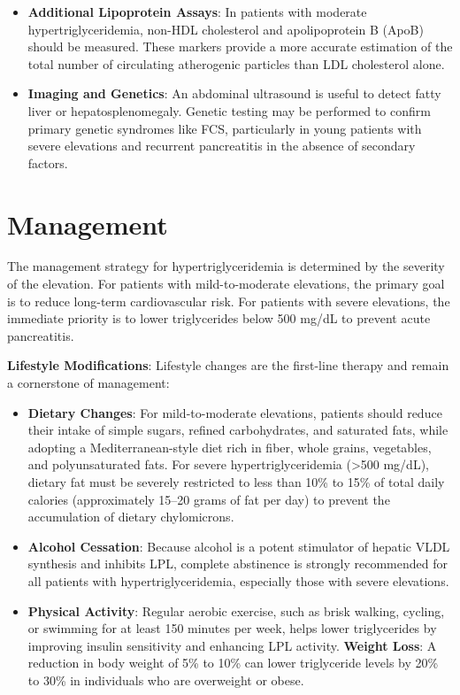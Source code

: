 \begin{itemize}
    \item \textbf{Additional Lipoprotein Assays}: In patients with moderate hypertriglyceridemia, non-HDL cholesterol and apolipoprotein B (ApoB) should be measured. These markers provide a more accurate estimation of the total number of circulating atherogenic particles than LDL cholesterol alone.
    \item \textbf{Imaging and Genetics}: An abdominal ultrasound is useful to detect fatty liver or hepatosplenomegaly. Genetic testing may be performed to confirm primary genetic syndromes like FCS, particularly in young patients with severe elevations and recurrent pancreatitis in the absence of secondary factors.
\end{itemize}

\section*{Management}
The management strategy for hypertriglyceridemia is determined by the severity of the elevation. For patients with mild-to-moderate elevations, the primary goal is to reduce long-term cardiovascular risk. For patients with severe elevations, the immediate priority is to lower triglycerides below 500 mg/dL to prevent acute pancreatitis.

\textbf{Lifestyle Modifications}:
Lifestyle changes are the first-line therapy and remain a cornerstone of management:
\begin{itemize}
    \item \textbf{Dietary Changes}: For mild-to-moderate elevations, patients should reduce their intake of simple sugars, refined carbohydrates, and saturated fats, while adopting a Mediterranean-style diet rich in fiber, whole grains, vegetables, and polyunsaturated fats. For severe hypertriglyceridemia (>500 mg/dL), dietary fat must be severely restricted to less than 10\% to 15\% of total daily calories (approximately 15--20 grams of fat per day) to prevent the accumulation of dietary chylomicrons.
    \item \textbf{Alcohol Cessation}: Because alcohol is a potent stimulator of hepatic VLDL synthesis and inhibits LPL, complete abstinence is strongly recommended for all patients with hypertriglyceridemia, especially those with severe elevations.
    \item \textbf{Physical Activity}: Regular aerobic exercise, such as brisk walking, cycling, or swimming for at least 150 minutes per week, helps lower triglycerides by improving insulin sensitivity and enhancing LPL activity.
    \textbf{Weight Loss}: A reduction in body weight of 5\% to 10\% can lower triglyceride levels by 20\% to 30\% in individuals who are overweight or obese.
\end{itemize}


